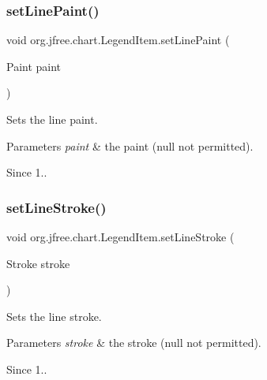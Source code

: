 \subsubsection{\texorpdfstring{set\+Line\+Paint()}{setLinePaint()}}
{\footnotesize\ttfamily void org.\+jfree.\+chart.\+Legend\+Item.\+set\+Line\+Paint (\begin{DoxyParamCaption}\item[{Paint}]{paint }\end{DoxyParamCaption})}

Sets the line paint.


\begin{DoxyParams}{Parameters}
{\em paint} & the paint ({\ttfamily null} not permitted).\\
\hline
\end{DoxyParams}
\begin{DoxySince}{Since}
1.. 
\end{DoxySince}
\mbox{\label{classorg_1_1jfree_1_1chart_1_1_legend_item_acee02a872194bdf70fd87d852caba2de}} 
\subsubsection{\texorpdfstring{set\+Line\+Stroke()}{setLineStroke()}}
{\footnotesize\ttfamily void org.\+jfree.\+chart.\+Legend\+Item.\+set\+Line\+Stroke (\begin{DoxyParamCaption}\item[{Stroke}]{stroke }\end{DoxyParamCaption})}

Sets the line stroke.


\begin{DoxyParams}{Parameters}
{\em stroke} & the stroke ({\ttfamily null} not permitted).\\
\hline
\end{DoxyParams}
\begin{DoxySince}{Since}
1.. 
\end{DoxySince}
\mbox{\label{classorg_1_1jfree_1_1chart_1_1_legend_item_abcb71ba1ad07cc2d43b0528b50217464}} 
